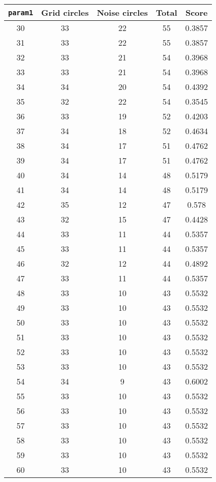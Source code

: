 \documentclass[letterpaper, 12pt]{article}
\begin{document}
\begin{longtable}{|c|c|c|c|c|}
\hline
\textbf{\texttt{param1}} & \textbf{Grid circles} & \textbf{Noise circles} & \textbf{Total} & \textbf{Score} \\
\hline
30 & 33 & 22 & 55 & 0.3857 \\
\hline
31 & 33 & 22 & 55 & 0.3857 \\
\hline
32 & 33 & 21 & 54 & 0.3968 \\
\hline
33 & 33 & 21 & 54 & 0.3968 \\
\hline
34 & 34 & 20 & 54 & 0.4392 \\
\hline
35 & 32 & 22 & 54 & 0.3545 \\
\hline
36 & 33 & 19 & 52 & 0.4203 \\
\hline
37 & 34 & 18 & 52 & 0.4634 \\
\hline
38 & 34 & 17 & 51 & 0.4762 \\
\hline
39 & 34 & 17 & 51 & 0.4762 \\
\hline
40 & 34 & 14 & 48 & 0.5179 \\
\hline
41 & 34 & 14 & 48 & 0.5179 \\
\hline
42 & 35 & 12 & 47 & 0.578 \\
\hline
43 & 32 & 15 & 47 & 0.4428 \\
\hline
44 & 33 & 11 & 44 & 0.5357 \\
\hline
45 & 33 & 11 & 44 & 0.5357 \\
\hline
46 & 32 & 12 & 44 & 0.4892 \\
\hline
47 & 33 & 11 & 44 & 0.5357 \\
\hline
48 & 33 & 10 & 43 & 0.5532 \\
\hline
49 & 33 & 10 & 43 & 0.5532 \\
\hline
50 & 33 & 10 & 43 & 0.5532 \\
\hline
51 & 33 & 10 & 43 & 0.5532 \\
\hline
52 & 33 & 10 & 43 & 0.5532 \\
\hline
53 & 33 & 10 & 43 & 0.5532 \\
\hline
54 & 34 & 9 & 43 & 0.6002 \\
\hline
55 & 33 & 10 & 43 & 0.5532 \\
\hline
56 & 33 & 10 & 43 & 0.5532 \\
\hline
57 & 33 & 10 & 43 & 0.5532 \\
\hline
58 & 33 & 10 & 43 & 0.5532 \\
\hline
59 & 33 & 10 & 43 & 0.5532 \\
\hline
60 & 33 & 10 & 43 & 0.5532 \\

\end{longtable}
\end{document}
